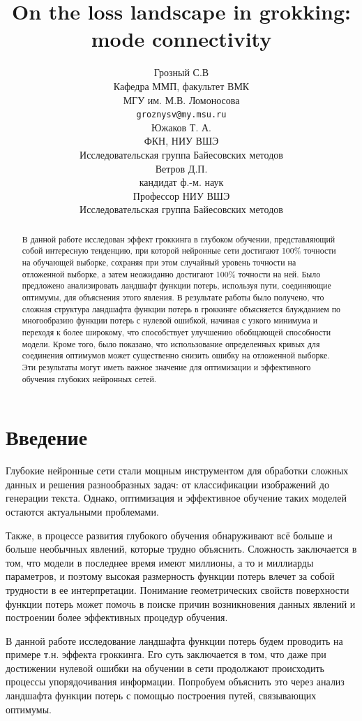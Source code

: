 \documentclass{article} %
\title{On the loss landscape in grokking: mode connectivity}
\author{ Грозный С.В \\
	Кафедра ММП, факультет ВМК \\
    МГУ им. М.В. Ломоносова\\
	\texttt{groznysv@my.msu.ru} \\
	\And
    Южаков Т. А.\\
	ФКН, НИУ ВШЭ\\
    Исследовательская группа Байесовских методов\\
    \And
    Ветров Д.П.\\
    кандидат ф.-м. наук\\
    Профессор НИУ ВШЭ\\
    Исследовательская группа Байесовских методов\\
}
\date{}
\begin{document}
\maketitle
\begin{abstract}
	В данной работе исследован эффект гроккинга в глубоком обучении, представляющий собой интересную тенденцию, при которой нейронные сети достигают 100\% точности на обучающей выборке, сохраняя при этом случайный уровень точности на отложенной выборке, а затем неожиданно достигают 100\% точности на ней. Было предложено анализировать ландшафт функции потерь, используя пути, соединяющие оптимумы, для объяснения этого явления. В результате работы было получено, что сложная структура ландшафта функции потерь в гроккинге объясняется блужданием по многообразию функции потерь с нулевой ошибкой, начиная с узкого минимума и переходя к более широкому, что способствует улучшению обобщающей способности модели. Кроме того, было показано, что использование определенных кривых для соединения оптимумов может существенно снизить ошибку на отложенной выборке. Эти результаты могут иметь важное значение для оптимизации и эффективного обучения глубоких нейронных сетей.
\end{abstract}
\section{Введение}
Глубокие нейронные сети стали мощным инструментом для обработки сложных данных и решения разнообразных задач: от классификации изображений до генерации текста. Однако, оптимизация и эффективное обучение таких моделей остаются актуальными проблемами.

Также, в процессе развития глубокого обучения обнаруживают всё больше и больше необычных явлений, которые трудно объяснить. Сложность заключается в том, что модели в последнее время имеют миллионы, а то и миллиарды параметров, и поэтому высокая размерность функции потерь влечет за собой трудности в ее интерпретации. Понимание геометрических свойств поверхности функции потерь может помочь в поиске причин возникновения данных явлений и построении более эффективных процедур обучения. 

В данной работе исследование ландшафта функции потерь будем проводить на примере т.н. эффекта гроккинга\cite{power2022grokking}. Его суть заключается в том, что даже при достижении нулевой ошибки на обучении в сети продолжают происходить процессы упорядочивания информации. Попробуем объяснить это через анализ ландшафта функции потерь с помощью построения путей, связывающих оптимумы. 
\end{document}
